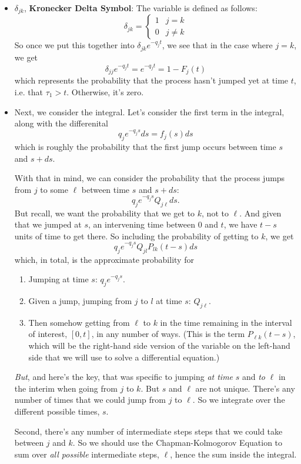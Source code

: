 \documentclass[a4paper,11pt]{scrartcl}
\begin{document}
\begin{itemize}
   \item{ $\delta_{jk}$, \textbf{Kronecker Delta Symbol}: The variable 
      is defined as follows:
	 \[ \delta_{jk} = \begin{cases} 1 & j=k \\ 0 & j \neq k 
	    \end{cases} \]
      So once we put this together into $\delta_{jk} e^{-q_j t}$, 
      we see that in the case where $j=k$, we get  
	 \[ \delta_{jj} e^{-q_j t} = e^{-q_j t} = 1-F_j(t) \]
      which represents the probability that the process hasn't jumped 
      yet at time $t$, i.e. that $\tau_1 > t$. Otherwise, it's
      zero.
	}
   
   \item{Next, we consider the integral.  Let's consider the first term 
	 in the integral, along with the differenital
	      \[ q_j e^{-q_j s}ds = f_j(s)ds\]
	 which is roughly the probability that the first jump occurs 
	 between time $s$ and $s + ds$.  

	 With that in mind, we can consider the probability that the 
	 process jumps from $j$ to some $\ell$ between time $s$ 
	 and $s+ds$:
	    \[ q_j e^{-q_j s}Q_{j\ell} ds. \]
	 But recall, we want the probability that we get to $k$, 
	 not to $\ell$.  And given that we jumped at $s$, an intervening 
	 time between $0$ and $t$, we have $t-s$ units of time to get 
	 there.  So including the probability of getting to $k$, we get
	    \[ q_j e^{-q_j s}Q_{jl}P_{lk}(t-s) ds \]
	 which, in total, is the approximate probability for 
	    \begin{enumerate}
	       
	       \item{Jumping at time $s$: $q_j e^{-q_j s}$.}
	       
	       \item{Given a jump, jumping from $j$ to $l$ at time $s$: 
		     $Q_{j\ell}$. }
	       
	       \item{Then somehow getting from $\ell$ to $k$ in the time 
		     remaining in the interval of interest, $[0,t]$, in	
		     any number of ways.  (This is the term $P_{\ell k}
		     (t-s)$, which will be the right-hand side version
		     of the variable on the left-hand side that we will 
		     use to solve a differential equation.)}
	    \end{enumerate}
			
	 \emph{But}, and here's the key, that was specific to jumping 
	 \emph{at time} $s$ and \emph{to} $\ell$ in the interim 
	 when going 
	 from $j$ to $k$.  But $s$ and $\ell$ are not unique.  
	 There's any 
	 number of times that we could jump from $j$ to $\ell$.  So we 
	 integrate over the different possible times, $s$.  
		
	 Second, there's any number of intermediate steps steps that we 
	 could take between $j$ and $k$.  So we should use the
	 Chapman-Kolmogorov Equation to sum over 
	 \emph{all possible} intermediate steps, $\ell$, hence the sum 
	 inside the integral.  
	}
\end{itemize}
\end{document}
